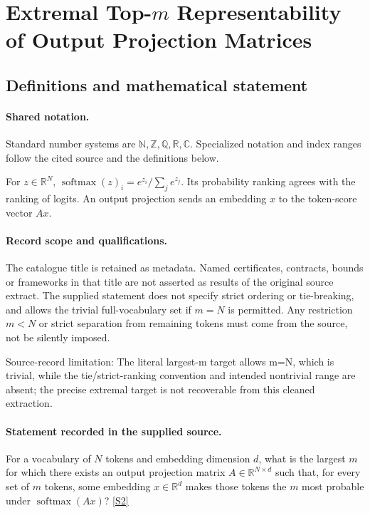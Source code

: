 \documentclass[11pt]{article}
\newcommand{\sref}[2]{\hyperlink{source:#1:#2}{[S#2]}}
\begin{document}
\section{Extremal Top-$m$ Representability of Output Projection Matrices}\label{statement}

\subsection{Definitions and mathematical statement}

\paragraph{Shared notation.}Standard number systems are $\mathbb N,\mathbb Z,\mathbb Q,\mathbb R,\mathbb C$. Specialized notation and index ranges follow the cited source and the definitions below.


For $z\in\mathbb R^N$, $\operatorname{softmax}(z)_i=e^{z_i}/\sum_j e^{z_j}$. Its probability ranking agrees with the ranking of logits. An output projection sends an embedding $x$ to the token-score vector $Ax$.
\paragraph{Record scope and qualifications.}
The catalogue title is retained as metadata. Named certificates, contracts, bounds or frameworks in that title are not asserted as results of the original source extract.
The supplied statement does not specify strict ordering or tie-breaking, and allows the trivial full-vocabulary set if $m=N$ is permitted. Any restriction $m<N$ or strict separation from remaining tokens must come from the source, not be silently imposed.

Source-record limitation: The literal largest-m target allows m=N, which is trivial, while the tie/strict-ranking convention and intended nontrivial range are absent; the precise extremal target is not recoverable from this cleaned extraction.
\paragraph{Statement recorded in the supplied source.}
For a vocabulary of $N$ tokens and embedding dimension $d$, what is the largest $m$ for which there exists an output projection matrix $A\in\mathbb R^{N\times d}$ such that, for every set of $m$ tokens, some embedding $x\in\mathbb R^d$ makes those tokens the $m$ most probable under $\operatorname{softmax}(Ax)$? \sref{statement}{2}
\end{document}
